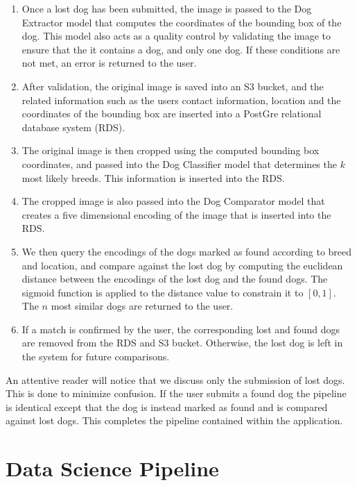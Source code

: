 \documentclass{article}
\begin{document}
\begin{enumerate}
  
  \item Once a lost dog has been submitted, the image is passed to the Dog Extractor model that computes the coordinates of the bounding box of the dog.  This model also acts as a quality control by validating the image to ensure that the it contains a dog, and only one dog.  If these conditions are not met, an error is returned to the user.
  
  \item After validation, the original image is saved into an S3 bucket, and the related information such as the users contact information, location and the coordinates of the bounding box are inserted into a PostGre relational database system (RDS).
  
  \item The original image is then cropped using the computed bounding box coordinates, and passed into the Dog Classifier model that determines the $k$ most likely breeds.  This information is inserted into the RDS.
  
  \item The cropped image is also passed into the Dog Comparator model that creates a five dimensional encoding of the image that is inserted into the RDS.
  
  \item We then query the encodings of the dogs marked as found according to breed and location, and compare against the lost dog by computing the euclidean distance between the encodings of the lost dog and the found dogs.  The sigmoid function is applied to the distance value to constrain it to $[0,1]$.  The $n$ most similar dogs are returned to the user.
  
  \item If a match is confirmed by the user, the corresponding lost and found dogs are removed from the RDS and S3 bucket.  Otherwise, the lost dog is left in the system for future comparisons.
 
\end{enumerate}

An attentive reader will notice that we discuss only the submission of lost dogs.  This is done to minimize confusion.  If the user submits a found dog the pipeline is identical except that the dog is instead marked as found and is compared against lost dogs.  This completes the pipeline contained within the application. 

\section{Data Science Pipeline}
\end{document}
